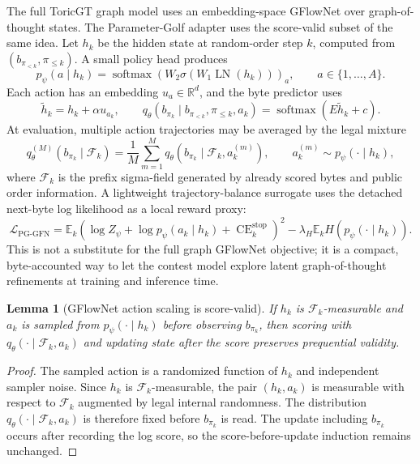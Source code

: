 \documentclass[11pt]{article}
\theoremstyle{definition}
\theoremstyle{plain}
\newtheorem{lemma}[definition]{Lemma}
\theoremstyle{remark}
\numberwithin{equation}{section}
\newcommand{\R}{\mathbb{R}}
\newcommand{\softmax}{\operatorname{softmax}}
\newcommand{\Eop}{\mathbb{E}}
\begin{document}
The full ToricGT graph model uses an embedding-space GFlowNet over graph-of-thought states.  The Parameter-Golf adapter uses the score-valid subset of the same idea.  Let $h_k$ be the hidden state at random-order step $k$, computed from $(b_{\pi_{<k}},\pi_{\le k})$.  A small policy head produces
\begin{equation}
  p_\psi(a\mid h_k)=\softmax(W_2\sigma(W_1\operatorname{LN}(h_k)))_a,
  \qquad a\in\{1,\ldots,A\}.
\end{equation}
Each action has an embedding $u_a\in\R^d$, and the byte predictor uses
\begin{equation}
  \widetilde h_k=h_k+\alpha u_{a_k},\qquad
  q_\theta(b_{\pi_k}\mid b_{\pi_{<k}},\pi_{\le k},a_k)=\softmax(E\widetilde h_k+c).
\end{equation}
At evaluation, multiple action trajectories may be averaged by the legal mixture
\begin{equation}
  q_\theta^{(M)}(b_{\pi_k}\mid\mathcal F_k)
  =\frac1M\sum_{m=1}^M q_\theta(b_{\pi_k}\mid \mathcal F_k,a_k^{(m)}),
  \qquad a_k^{(m)}\sim p_\psi(\cdot\mid h_k),
\end{equation}
where $\mathcal F_k$ is the prefix sigma-field generated by already scored bytes and public order information.  A lightweight trajectory-balance surrogate uses the detached next-byte log likelihood as a local reward proxy:
\begin{equation}
  \mathcal L_{\mathrm{PG\text{-}GFN}}
  =
  \Eop_k\left(\log Z_\psi+\log p_\psi(a_k\mid h_k)+
  \operatorname{CE}_k^\mathrm{stop}\right)^2
  -\lambda_H\Eop_k H(p_\psi(\cdot\mid h_k)).
\end{equation}
This is not a substitute for the full graph GFlowNet objective; it is a compact, byte-accounted way to let the contest model explore latent graph-of-thought refinements at training and inference time.

\begin{lemma}[GFlowNet action scaling is score-valid]
If $h_k$ is $\mathcal F_k$-measurable and $a_k$ is sampled from $p_\psi(\cdot\mid h_k)$ before observing $b_{\pi_k}$, then scoring with $q_\theta(\cdot\mid\mathcal F_k,a_k)$ and updating state after the score preserves prequential validity.
\end{lemma}

\begin{proof}
The sampled action is a randomized function of $h_k$ and independent sampler noise.  Since $h_k$ is $\mathcal F_k$-measurable, the pair $(h_k,a_k)$ is measurable with respect to $\mathcal F_k$ augmented by legal internal randomness.  The distribution $q_\theta(\cdot\mid\mathcal F_k,a_k)$ is therefore fixed before $b_{\pi_k}$ is read.  The update including $b_{\pi_k}$ occurs after recording the log score, so the score-before-update induction remains unchanged.
\end{proof}
\end{document}
